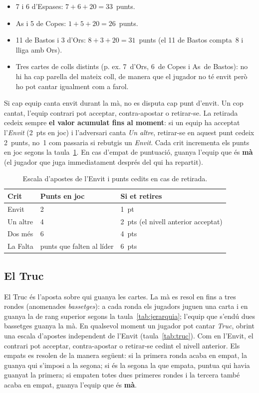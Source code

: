 \begin{itemize}
  \item 7 i 6 d'Espases: $7 + 6 + 20 = 33$~punts.
  \item As i 5 de Copes: $1 + 5 + 20 = 26$~punts.
  \item 11 de Bastos i 3 d'Ors: $8 + 3 + 20 = 31$~punts (el 11 de Bastos
        compta~8 i lliga amb Ors).
  \item Tres cartes de colls distints (p. ex. 7~d'Ors, 6~de Copes i As~de
        Bastos): no hi ha cap parella del mateix coll, de manera que el jugador
        no té envit però ho pot cantar igualment com a farol.
\end{itemize}

Si cap equip canta envit durant la mà, no es disputa cap punt d'envit. Un cop
cantat, l'equip contrari pot acceptar, contra-apostar o retirar-se. La
retirada cedeix sempre \textbf{el valor acumulat fins al moment}: si un equip
ha acceptat l'\emph{Envit} (2~pts en joc) i l'adversari canta \emph{Un
altre}, retirar-se en aquest punt cedeix 2~punts, no~1 com passaria si rebutgis un \emph{Envit}. Cada crit incrementa
els punts en joc segons la taula~\ref{tab:envit}. En cas d'empat de puntuació,
guanya l'equip que és \textbf{mà} (el jugador que juga immediatament després del qui ha repartit).

\begin{table}[H]
  \centering
  \begin{tabular}{lll}
    \toprule
    Crit & Punts en joc & Si et retires \\
    \midrule
    Envit     & 2 & 1~pt \\
    Un altre  & 4 & 2~pts (el nivell anterior acceptat) \\
    Dos més   & 6 & 4~pts \\
    La Falta  & punts que falten al líder & 6~pts \\
    \bottomrule
  \end{tabular}
  \caption{Escala d'apostes de l'Envit i punts cedits en cas de retirada.}
  \label{tab:envit}
\end{table}

\subsection*{El Truc}

El Truc és l'aposta sobre qui guanya les cartes. La mà es resol en fins a tres
rondes (anomenades \emph{bassetges}): a cada ronda els jugadors juguen una carta i
en guanya la de rang superior segons la taula~\ref{tab:jerarquia}; l'equip que
s'endú dues bassetges guanya la mà. En qualsevol moment un jugador pot cantar
\emph{Truc}, obrint una escala d'apostes independent de l'Envit
(taula~\ref{tab:truc}). Com en l'Envit, el contrari pot acceptar, contra-apostar o
retirar-se cedint el nivell anterior. Els empats es resolen de la manera
següent: si la primera ronda acaba en empat, la guanya qui s'imposi a la segona; si és la segona la que empata, puntua qui havia guanyat la primera; si empaten totes dues primeres rondes i la tercera també acaba en empat,
guanya l'equip que és \textbf{mà}.

